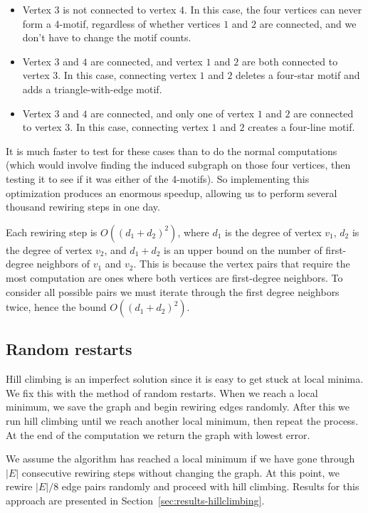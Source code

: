 \begin{itemize}
\item Vertex $3$ is not connected to vertex $4$.  In this case, the four vertices can never form a 4-motif, regardless of whether vertices $1$ and $2$ are connected, and we don't have to change the motif counts.
\item Vertex $3$ and $4$ are connected, and vertex $1$ and $2$ are both connected to vertex $3$.  In this case, connecting vertex $1$ and $2$ deletes a four-star motif and adds a triangle-with-edge motif.
\item Vertex $3$ and $4$ are connected, and only one of vertex $1$ and $2$ are connected to vertex $3$.  In this case, connecting vertex $1$ and $2$ creates a four-line motif.
\end{itemize}

It is much faster to test for these cases than to do the normal
computations (which would involve finding the induced subgraph on those
four vertices, then testing it to see if it was either of the 4-motifs).
So implementing this optimization produces an enormous speedup, allowing us
to perform several thousand rewiring steps in one day.

Each rewiring step is $O((d_1 + d_2)^2)$, where $d_1$ is the degree of vertex $v_1$, $d_2$
is the degree of vertex $v_2$, and $d_1 + d_2$ is an upper bound on the 
number of first-degree neighbors of $v_1$ and $v_2$.  This is because the
vertex pairs that require the most computation are ones where both vertices
are first-degree neighbors.  To consider all possible pairs we must iterate through
the first degree neighbors twice, hence the bound $O((d_1 + d_2)^2)$.

\subsection{Random restarts}

Hill climbing is an imperfect solution since it is easy to get stuck at
local minima.  We fix this with the method of random restarts.  When we
reach a local minimum, we save the graph and begin rewiring edges randomly.
After this we run hill climbing until we reach another local minimum, then 
repeat the process.  At the end of the computation we return the graph with
lowest error.

We assume the algorithm has reached a local minimum if we have gone through
$|E|$ consecutive rewiring steps without changing the graph.  At this
point, we rewire $|E|/8$ edge pairs randomly and proceed with hill
climbing.  Results for this approach are presented in Section~\ref{sec:results-hillclimbing}.
